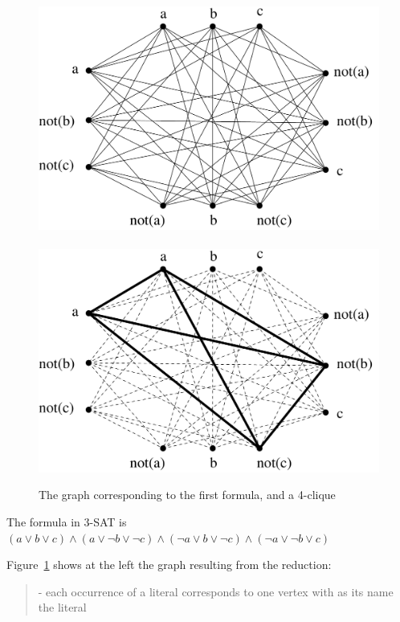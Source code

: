 {\begin{figure}[h]
\begin{center}
\includegraphics[height=0.2\textheight,keepaspectratio]{satclique}
~~~~~~~~~\includegraphics[height=0.2\textheight,keepaspectratio]{satcliquesol}
\caption{The graph corresponding to the first formula, and a
4-clique}\label{satclique}
\end{center}
\end{figure}

\begin{example}
The formula in 3-SAT is
$(a \vee b \vee c) \wedge (a \vee \neg b \vee \neg c) \wedge (\neg a \vee b \vee \neg c) \wedge (\neg a \vee \neg b \vee c)$

Figure~\ref{satclique} shows at the left the graph resulting from the
reduction:
\begin{verse}
- each occurrence of a literal corresponds to one vertex with as its
name the literal


\end{verse}
\end{example}}
